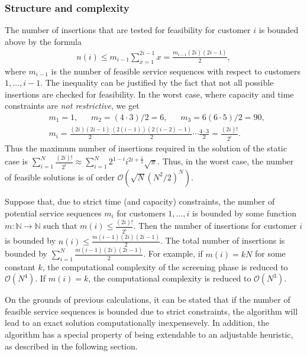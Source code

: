 \documentclass[dissertation,draft*]{aaltoseries}
\begin{document}
\subsubsection{Structure and complexity}
The number of insertions that are tested for feasibility for customer $i$ is bounded above 
by the formula
\begin{align}
n(i) \leq m_{i-1} \sum_{x=1}^{2i-1} x  = \frac{m_{i-1}(2i)(2i-1)}{2},
\end{align}
where $m_{i-1}$ is the number of feasible service sequences with respect to customers $1, \ldots,i-1$.
The inequality can be justified by the fact that not all possible insertions  
are checked for feasibility. 
In the worst case, where capacity and time constraints are \emph{not restrictive},
we get 
\begin{align*}
& m_1 = 1, \ \ \ \ \ \ \ m_2 = (4 \cdot 3)/2 = 6,  \ \ \ \ \ \ \ m_3 = 6(6 \cdot 5)/2 = 90, \\
& m_i = \frac{(2i)(2i-1)}{2} \frac{(2(i-1))(2(i-2)-1)}{2} \cdots \frac{4 \cdot 3}{2} = \frac{(2i)!}{2^i}. 
\end{align*}
Thus the maximum number of insertions required in the solution of the static case is
$\sum_{i=1}^{N}\frac{(2i)!}{2^i} \approx \sum_{i=1}^{N} {2^{1-i} i^{2i + \frac 12} \sqrt{\pi}}$.
Thus, in the worst case, the number of feasible solutions is of order
$\mathcal{O}(\sqrt{N} (N^2/2)^N)$.

Suppose that, due to strict time (and capacity) constraints, the number of potential service sequences $m_i$ for customers $1,\ldots, i$
is bounded by some function $m:\mathbb{N} \to \mathbb{N}$ such that $m(i) \leq \frac{(2i)!}{2^i}$.
Then the number of insertions for customer $i$ is bounded by $n(i) \leq \frac{m(i-1)(2i)(2i-1)}{2}$.
The total number of insertions is bounded by $\sum_{i=1}^{N}\frac{m(i-1)(2i)(2i-1)}{2}$.
For example, if $m(i) = kN$ for some constant $k$, the computational complexity of the screening phase
is reduced to $\mathcal{O}(N^4)$. 
If $m(i) = k$, the computational complexity is reduced to $\mathcal{O}(N^3)$.

On the grounds of previous calculations, it can be stated that if the number
of feasible service sequences is bounded due to strict constraints, the 
algorithm will lead to an exact solution computationally inexpensevely.
In addition, the 
algorithm has a special property of being extendable to an adjustable heuristic,
as described in the following section.
\end{document}

